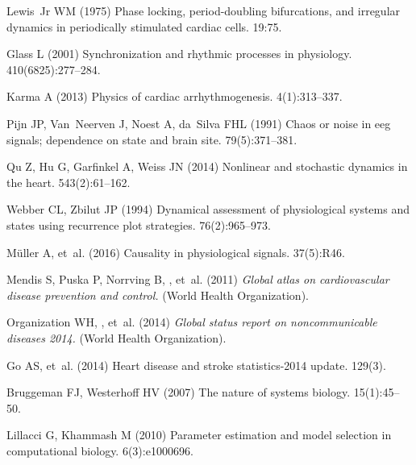 \documentclass[9pt,twocolumn,twoside]{pnas-new}
\begin{document}
%
\begin{thebibliography}{10}

Lewis~Jr WM (1975) Phase locking, period-doubling bifurcations, and irregular
  dynamics in periodically stimulated cardiac cells.
 19:75.

Glass L (2001) Synchronization and rhythmic processes in physiology.
 410(6825):277--284.

Karma A (2013) Physics of cardiac arrhythmogenesis.
 4(1):313--337.

Pijn JP, Van~Neerven J, Noest A, da~Silva FHL (1991) Chaos or noise in eeg
  signals; dependence on state and brain site.
  79(5):371--381.

Qu Z, Hu G, Garfinkel A, Weiss JN (2014) Nonlinear and stochastic dynamics in
  the heart.
 543(2):61--162.

Webber CL, Zbilut JP (1994) Dynamical assessment of physiological systems and
  states using recurrence plot strategies.
 76(2):965--973.

M{\"u}ller A, et~al. (2016) Causality in physiological signals.
 37(5):R46.

Mendis S, Puska P, Norrving B, , et~al. (2011) {\em Global atlas on
  cardiovascular disease prevention and control.}
\newblock (World Health Organization).

Organization WH, , et~al. (2014) {\em Global status report on noncommunicable
  diseases 2014.}
\newblock (World Health Organization).

Go AS, et~al. (2014) Heart disease and stroke statistics-2014 update.
 129(3).

Bruggeman FJ, Westerhoff HV (2007) The nature of systems biology.
 15(1):45--50.

Lillacci G, Khammash M (2010) Parameter estimation and model selection in
  computational biology.
 6(3):e1000696.


\end{thebibliography}
\end{document}
